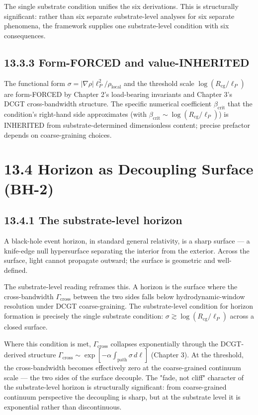 \documentclass[11pt]{book}
\begin{document}
The single substrate condition unifies the six derivations. This is structurally significant: rather than six separate substrate-level analyses for six separate phenomena, the framework supplies one substrate-level condition with six consequences.

\subsection{13.3.3 Form-FORCED and value-INHERITED}

The functional form $\sigma = |\nabla\rho|\ell_P^2/\rho_\mathrm{local}$ and the threshold scale $\log(R_\mathrm{cg}/\ell_P)$ are form-FORCED by Chapter 2's load-bearing invariants and Chapter 3's DCGT cross-bandwidth structure. The specific numerical coefficient $\beta_\mathrm{crit}$ that the condition's right-hand side approximates (with $\beta_\mathrm{crit} \sim \log(R_\mathrm{cg}/\ell_P)$) is INHERITED from substrate-determined dimensionless content; precise prefactor depends on coarse-graining choices.

\section{13.4 Horizon as Decoupling Surface (BH-2)}

\subsection{13.4.1 The substrate-level horizon}

A black-hole event horizon, in standard general relativity, is a sharp surface — a knife-edge null hypersurface separating the interior from the exterior. Across the surface, light cannot propagate outward; the surface is geometric and well-defined.

The substrate-level reading reframes this. A horizon is the surface where the cross-bandwidth $\Gamma_\mathrm{cross}$ between the two sides falls below hydrodynamic-window resolution under DCGT coarse-graining. The substrate-level condition for horizon formation is precisely the single substrate condition: $\sigma \gtrsim \log(R_\mathrm{cg}/\ell_P)$ across a closed surface.

Where this condition is met, $\Gamma_\mathrm{cross}$ collapses exponentially through the DCGT-derived structure $\Gamma_\mathrm{cross} \sim \exp[-\alpha\int_\mathrm{path}\sigma\,d\ell]$ (Chapter 3). At the threshold, the cross-bandwidth becomes effectively zero at the coarse-grained continuum scale — the two sides of the surface decouple. The "fade, not cliff" character of the substrate-level horizon is structurally significant: from coarse-grained continuum perspective the decoupling is sharp, but at the substrate level it is exponential rather than discontinuous.
\end{document}
